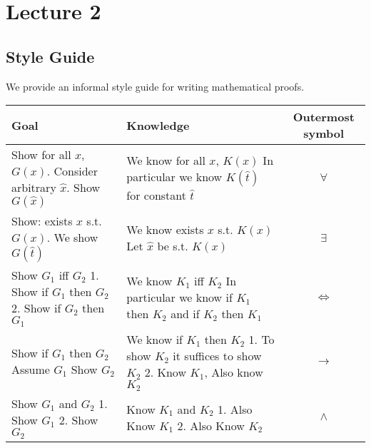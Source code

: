 \section{Lecture 2}

\subsection{Style Guide}
We provide an informal style guide for writing mathematical proofs. 

\begin{center}
    \begin{tabular}{l|l|c}
     Goal & Knowledge & Outermost symbol \\
    \hline 
     \pbox{20cm}{Show for all $x$, $G(x)$. \\ Consider arbitrary $\hat{x}$.\\ Show $G(\hat{x})$} & \pbox{20cm}{We know for all $x$, $K(x)$ \\ In particular we know $K(\hat{t})$ for constant $\hat{t}$} & $\forall$ \\ 
    \hline 
     \pbox{20cm}{Show: exists $x$ s.t. $G(x)$. \\ We show $G(\hat{t})$} & \pbox{20cm}{We know exists $x$ s.t. $K(x)$ \\ Let $\hat{x}$ be s.t. $K(x)$} & $\exists$ \\ 
     \hline 
     \pbox{20cm}{Show $G_1$ iff $G_2$ \\ 1. Show if $G_1$ then $G_2$\\ 2. Show if $G_2$ then $G_1$} & \pbox{20cm}{We know $K_1$ iff $K_2$\\ In particular we know if $K_1$ then $K_2$\\ and if $K_2$ then $K_1$} & $\iff$ \\ 
     \hline 
     \pbox{20cm}{Show if $G_1$ then $G_2$ \\ Assume $G_1$\\ Show $G_2$} & \pbox{20cm}{We know if $K_1$ then $K_2$\\ 1. To show $K_2$ it suffices to show $K_2$\\ 2. Know $K_1$, Also know $K_2$} & $\rightarrow$ \\ 
     \hline 
     \pbox{20cm}{Show $G_1$ and $G_2$\\ 1. Show $G_1$\\ 2. Show $G_2$} & \pbox{20cm}{Know $K_1$ and $K_2$\\ 1. Also Know $K_1$ \\ 2. Also Know $K_2$} & $\wedge$ \\ 

\end{tabular}
\end{center}

